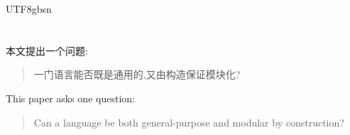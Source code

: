 \begin{CJK*}{UTF8}{gbsn}
\section{}
\label{sec:introduction}
\ifPaperChinese
本文提出一个问题:
\begin{quote}
  一门语言能否既是通用的,又由构造保证模块化?
\end{quote}
\else
This paper asks one question:
\begin{quote}
  Can a language be both general-purpose and modular by construction?
\end{quote}
\fi


\end{CJK*}
